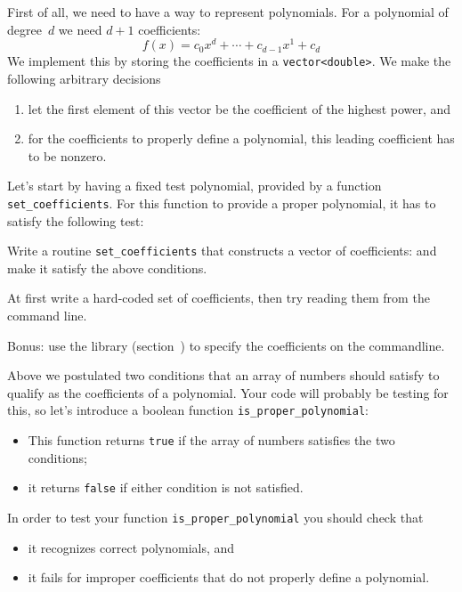 First of all, we need to have a way to represent polynomials.
For a polynomial of degree~$d$ we need $d+1$ coefficients:
\begin{equation}
  f(x) = c_0 x^d + \cdots + c_{d-1} x^1 + c_d
  \label{eq:poly-coeff}
\end{equation}
We implement this by storing the coefficients in a
\lstinline+vector<double>+.
We make the following arbitrary decisions
\begin{enumerate}
\item let the first element
  of this vector be the coefficient of the highest power, and
\item 
  for the coefficients to properly define a polynomial,
  this leading coefficient has to be nonzero.
\end{enumerate}
Let's start by having a fixed test polynomial,
provided by a function \lstinline+set_coefficients+.
For this function to provide a proper polynomial,
it has to satisfy the following test:
%

\begin{exercise}
  \label{ex:bisect-coeff}
  Write a routine \lstinline+set_coefficients+ that constructs
  a vector of coefficients:
  and make it satisfy the above conditions.
  
  At first write a hard-coded set of coefficients,
  then try reading them from the command line.
\end{exercise}

\begin{exercise}
  Bonus: use the  library
  (section~)
  to specify the coefficients on the commandline.
\end{exercise}

Above we postulated two conditions that an array of numbers should satisfy
to qualify as the coefficients of a polynomial.
Your code will probably be testing for this,
so let's introduce a boolean function
\lstinline+is_proper_polynomial+:
\begin{itemize}
\item This function returns \lstinline{true} if the array of numbers satisfies
  the two conditions;
\item it returns \lstinline{false} if either condition is not satisfied.
\end{itemize}

In order to test your function \lstinline+is_proper_polynomial+ you should check that
\begin{itemize}
\item
  it recognizes correct polynomials, and
\item it fails for improper coefficients that do not properly define a polynomial.
\end{itemize}

